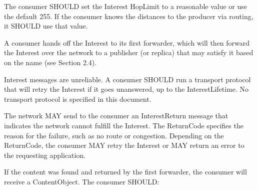 \documentclass[12pt]{report}
\begin{document}
The consumer SHOULD set the Interest HopLimit to a reasonable value
or use the default 255.  If the consumer knows the distances to the
producer via routing, it SHOULD use that value.

A consumer hands off the Interest to its first forwarder, which will
then forward the Interest over the network to a publisher (or
replica) that may satisfy it based on the name (see Section 2.4).

Interest messages are unreliable.  A consumer SHOULD run a transport
protocol that will retry the Interest if it goes unanswered, up to
the InterestLifetime.  No transport protocol is specified in this
document.

The network MAY send to the consumer an InterestReturn message that
indicates the network cannot fulfill the Interest.  The ReturnCode
specifies the reason for the failure, such as no route or congestion.
Depending on the ReturnCode, the consumer MAY retry the Interest or
MAY return an error to the requesting application.

If the content was found and returned by the first forwarder, the
consumer will receive a ContentObject.  The consumer SHOULD:
\end{document}
